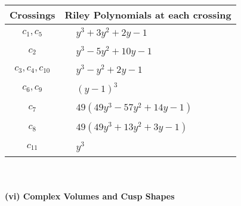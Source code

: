 \documentclass[1p]{elsarticle_modified}
\theoremstyle{definition}
\begin{document}
\begin{tabular}{m{50pt}|m{274pt}}
Crossings & \hspace{64pt}Riley Polynomials at each crossing \\
\hline $$\begin{aligned}c_{1},c_{5}\end{aligned}$$&$\begin{aligned}
&y^3+3 y^2+2 y-1
\end{aligned}$\\
\hline $$\begin{aligned}c_{2}\end{aligned}$$&$\begin{aligned}
&y^3-5 y^2+10 y-1
\end{aligned}$\\
\hline $$\begin{aligned}c_{3},c_{4},c_{10}\end{aligned}$$&$\begin{aligned}
&y^3- y^2+2 y-1
\end{aligned}$\\
\hline $$\begin{aligned}c_{6},c_{9}\end{aligned}$$&$\begin{aligned}
&(y-1)^3
\end{aligned}$\\
\hline $$\begin{aligned}c_{7}\end{aligned}$$&$\begin{aligned}
&49(49 y^3-57 y^2+14 y-1)
\end{aligned}$\\
\hline $$\begin{aligned}c_{8}\end{aligned}$$&$\begin{aligned}
&49(49 y^3+13 y^2+3 y-1)
\end{aligned}$\\
\hline $$\begin{aligned}c_{11}\end{aligned}$$&$\begin{aligned}
&y^3
\end{aligned}$\\
\hline
\end{tabular}\\~\\
\newpage\flushleft \textbf{(vi) Complex Volumes and Cusp Shapes}
\end{document}
